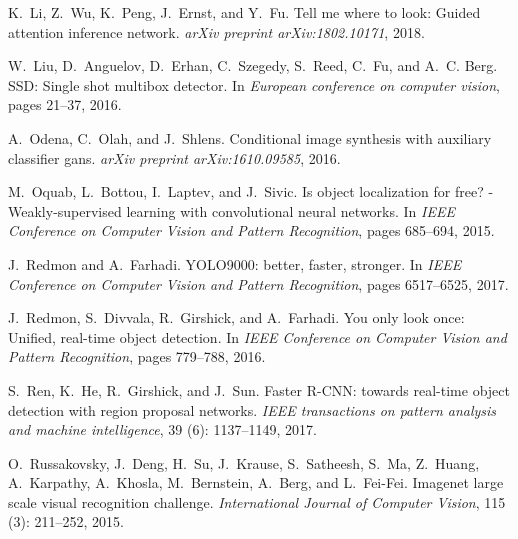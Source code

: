 \documentclass{bmvc2k}
\begin{document}
\begin{thebibliography}{33}
K.~Li, Z.~Wu, K.~Peng, J.~Ernst, and Y.~Fu.
\newblock Tell me where to look: Guided attention inference network.
\newblock \emph{arXiv preprint arXiv:1802.10171}, 2018{}.

W.~Liu, D.~Anguelov, D.~Erhan, C.~Szegedy, S.~Reed, C.~Fu, and A.~C. Berg.
\newblock S{S}{D}: Single shot multibox detector.
\newblock In \emph{European conference on computer vision}, pages 21--37, 2016.

A.~Odena, C.~Olah, and J.~Shlens.
\newblock Conditional image synthesis with auxiliary classifier gans.
\newblock \emph{arXiv preprint arXiv:1610.09585}, 2016.

M.~Oquab, L.~Bottou, I.~Laptev, and J.~Sivic.
\newblock Is object localization for free? - {W}eakly-supervised learning with
  convolutional neural networks.
\newblock In \emph{IEEE Conference on Computer Vision and Pattern Recognition},
  pages 685--694, 2015.

J.~Redmon and A.~Farhadi.
\newblock Y{O}{L}{O}9000: better, faster, stronger.
\newblock In \emph{IEEE Conference on Computer Vision and Pattern Recognition},
  pages 6517--6525, 2017.

J.~Redmon, S.~Divvala, R.~Girshick, and A.~Farhadi.
\newblock You only look once: Unified, real-time object detection.
\newblock In \emph{IEEE Conference on Computer Vision and Pattern Recognition},
  pages 779--788, 2016.

S.~Ren, K.~He, R.~Girshick, and J.~Sun.
\newblock Faster {R}-{C}{N}{N}: towards real-time object detection with region
  proposal networks.
\newblock \emph{IEEE transactions on pattern analysis and machine
  intelligence}, 39 (6): 1137--1149, 2017.

O.~Russakovsky, J.~Deng, H.~Su, J.~Krause, S.~Satheesh, S.~Ma, Z.~Huang,
  A.~Karpathy, A.~Khosla, M.~Bernstein, A.~Berg, and L.~Fei-Fei.
\newblock Imagenet large scale visual recognition challenge.
\newblock \emph{International Journal of Computer Vision}, 115
  (3): 211--252, 2015.


\end{thebibliography}
\end{document}

